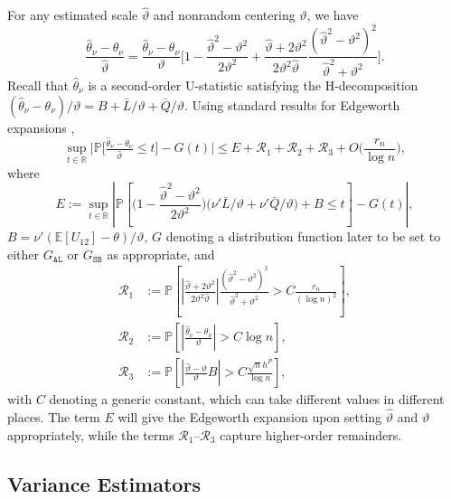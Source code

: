 \documentclass[11pt]{article}
\numberwithin{equation}{section}
\theoremstyle{definition}
\renewcommand{\P}{\mathbb{P}}
\newcommand{\E}{\mathbb{E}}
\newcommand{\R}{\mathbb{R}}
\newcommand{\Center}{\theta}
\newcommand{\Scale}{\vartheta}
\begin{document}
For any estimated scale $\widehat{\Scale}$ and nonrandom centering $\Scale$, we have
\[\frac{\widehat{\theta}_\nu - \theta_\nu}{\widehat{\Scale}}
  = \frac{\widehat{\theta}_\nu - \theta_\nu}{\Scale}
    \Big[ 1 - \frac{\widehat{\Scale}^2 - \Scale^2}{2\Scale^2} 
            + \frac{\widehat{\Scale}+2\Scale^2}{2\Scale^2 \widehat{\Scale}}
              \frac{(\widehat{\Scale}^2 - \Scale^2)^2}{\widehat{\Scale}^2 + \Scale^2}\Big].
\]
Recall that $\widehat{\theta}_\nu$ is a second-order U-statistic satisfying the H-decomposition $(\widehat{\theta}_\nu - \theta_\nu)/\Scale = B + \bar{L}/\Scale + \bar{Q}/\Scale$. Using standard results for Edgeworth expansions \citep{Bhattacharya-Rao1976_book,Hall1992_book},
\begin{equation*}
    \sup_{t\in\R}\Big|\P\Big[\tfrac{\widehat{\theta}_\nu - \theta_\nu}{\widehat{\Scale}} \leq t \Big] - G(t) \Big| \leq E + \mathcal{R}_1 + \mathcal{R}_2 + \mathcal{R}_3 + O\Big(\frac{r_n}{\log n}\Big),
\end{equation*}
where
\begin{equation*}
    E := \sup_{t\in\R}\left|\P\left[
    \Big(1 - \frac{\widehat{\Scale}^2 - \Scale^2}{2\Scale^2} \Big)
    \Big(\nu'\bar{L}/\Scale + \nu'\bar{Q}/\Scale\Big) + B \leq t \right]
    - G(t)\right|,
\end{equation*}
$B= \nu'(\E[U_{12}]-\Center)/\Scale$, $G$ denoting a distribution function later to be set to either $G_\mathtt{AL}$ or $G_\mathtt{SB}$ as appropriate, and
\begin{align*}
    \mathcal{R}_1 &:= \P\left[\left|\frac{\widehat{\Scale}+2\Scale^2}{2\Scale^2 \widehat{\Scale}}\right|
                    \frac{(\widehat{\Scale}^2 - \Scale^2)^2}{\widehat{\Scale}^2 + \Scale^2}  > C \frac{r_n}{(\log n)^2} \right],\\
    \mathcal{R}_2 &:= \P\left[\left|\frac{\widehat{\theta}_\nu - \theta_\nu}{\Scale} \right| > C \log n \right],\\
    \mathcal{R}_3 &:= \P\left[\left|\frac{\widehat{\Scale}-\Scale}{\Scale} B \right| > C \frac{\sqrt{n}h^P}{\log n} \right],
\end{align*}
with $C$ denoting a generic constant, which can take different values in different places. The term $E$ will give the Edgeworth expansion upon setting $\widehat{\Scale}$ and $\Scale$ appropriately, while the terms $\mathcal{R}_1$--$\mathcal{R}_3$ capture higher-order remainders. 


\subsection*{Variance Estimators}
\end{document}
